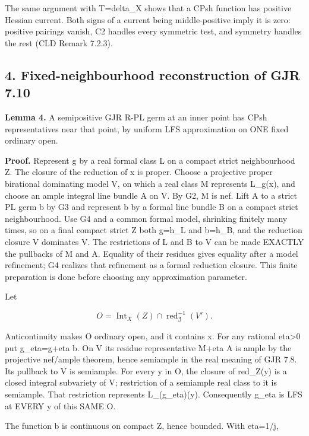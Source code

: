 \documentclass[
  11pt,
]{article}
\begin{document}
The same argument with T=delta\_X shows that a CPsh function has
positive Hessian current. Both signs of a current being middle-positive
imply it is zero: positive pairings vanish, C2 handles every symmetric
test, and symmetry handles the rest (CLD Remark 7.2.3).

\subsection{4. Fixed-neighbourhood reconstruction of GJR
7.10}\label{fixed-neighbourhood-reconstruction-of-gjr-7.10}

\textbf{Lemma 4.} A semipositive GJR R-PL germ at an inner point has
CPsh representatives near that point, by uniform LFS approximation on
ONE fixed ordinary open.

\textbf{Proof.} Represent g by a real formal class L on a compact strict
neighbourhood Z. The closure of the reduction of x is proper. Choose a
projective proper birational dominating model V, on which a real class M
represents L\_g(x), and choose an ample integral line bundle A on V. By
G2, M is nef. Lift A to a strict PL germ b by G3 and represent b by a
formal line bundle B on a compact strict neighbourhood. Use G4 and a
common formal model, shrinking finitely many times, so on a final
compact strict Z both g=h\_L and b=h\_B, and the reduction closure
V\textquotesingle{} dominates V. The restrictions of L and B to
V\textquotesingle{} can be made EXACTLY the pullbacks of M and A.
Equality of their residues gives equality after a model refinement; G4
realizes that refinement as a formal reduction closure. This finite
preparation is done before choosing any approximation parameter.

Let

\[
O=\operatorname{Int}_X(Z)\cap\operatorname{red}_{\mathfrak Z}^{-1}(V\prime).
\]

Anticontinuity makes O ordinary open, and it contains x. For any
rational eta\textgreater0 put g\_eta=g+eta b. On V its residue
representative M+eta A is ample by the projective nef/ample theorem,
hence semiample in the real meaning of GJR 7.8. Its pullback to
V\textquotesingle{} is semiample. For every y in O, the closure of
red\_Z(y) is a closed integral subvariety of V\textquotesingle;
restriction of a semiample real class to it is semiample. That
restriction represents L\_(g\_eta)(y). Consequently g\_eta is LFS at
EVERY y of this SAME O.

The function b is continuous on compact Z, hence bounded. With eta=1/j,
\end{document}
